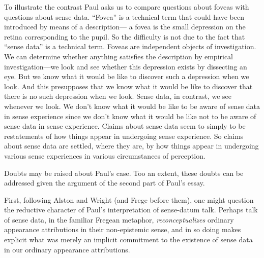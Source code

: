 \documentclass[11pt]{article}
\begin{document}
To illustrate the contrast Paul asks us to compare questions about foveas with questions about sense data. ``Fovea'' is a technical term that could have been introduced by means of a description--- a fovea is the small depression on the retina corresponding to the pupil. So the difficulty is not due to the fact that ``sense data'' is a technical term. Foveas are independent objects of investigation. We can determine whether anything satisfies the description by empirical investigation---we look and see whether this depression exists by dissecting an eye. But we know what it would be like to discover such a depression when we look. And this presupposes that we know what it would be like to discover that there is no such depression when we look. Sense data, in contrast, we see whenever we look. We don't know what it would be like to be aware of sense data in sense experience since we don't know what it would be like not to be aware of sense data in sense experience. Claims about sense data seem to simply to be restatements of how things appear in undergoing sense experience. So claims about sense data are settled, where they are, by how things appear in undergoing various sense experiences in various circumstances of perception.

\begin{discussion}
    Doubts may be raised about Paul's case. Too an extent, these doubts can be addressed given the argument of the second part of Paul's essay.
    
    First, following Alston and Wright (and Frege before them), one might question the reductive character of Paul's interpretation of sense-datum talk. Perhaps talk of sense data, in the familiar Fregean metaphor, \emph{reconceptualizes} ordinary appearance attributions in their non-epistemic sense, and in so doing makes explicit what was merely an implicit commitment to the existence of sense data in our ordinary appearance attributions.
\end{discussion}
\end{document}
